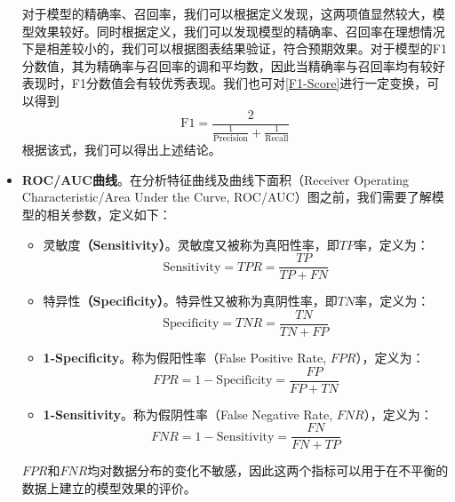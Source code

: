 \documentclass{MathorCupmodeling}
\begin{document}
\begin{itemize}
		对于模型的精确率、召回率，我们可以根据定义发现，这两项值显然较大，模型效果较好。同时根据定义，我们可以发现模型的精确率、召回率在理想情况下是相差较小的，我们可以根据图表结果验证，符合预期效果。对于模型的F1分数值，其为精确率与召回率的调和平均数，因此当精确率与召回率均有较好表现时，F1分数值会有较优秀表现。我们也可对\textcolor{blue}{\eqref{F1-Score}}进行一定变换，可以得到
		\begin{equation}
			\mathrm{F}1=\frac{2}{\frac{1}{\mathrm{Precision}}+\frac{1}{\mathrm{Recall}}} \label{ReacllNew}
		\end{equation}
		根据该式，我们可以得出上述结论。
		\item \textbf{ROC/AUC曲线}。在分析特征曲线及曲线下面积（Receiver Operating Characteristic/Area Under the Curve, ROC/AUC）图之前，我们需要了解模型的相关参数，定义如下：
		\begin{itemize}
			\item {\heiti 灵敏度}\textbf{（Sensitivity）}。灵敏度又被称为真阳性率，即$TP$率，定义为：
			\begin{equation}
				\mathrm{Sensitivity}=TPR=\frac{TP}{TP+FN} \label{Sensitivity}
			\end{equation}
			\item {\heiti 特异性}\textbf{（Specificity）}。特异性又被称为真阴性率，即$TN$率，定义为：
			\begin{equation}
				\mathrm{Specificity}=TNR=\frac{TN}{TN+FP} \label{Specificity}
			\end{equation}
			\item \textbf{1-Specificity}。称为假阳性率（False Positive Rate, $FPR$），定义为：
			\begin{equation}
				FPR=1-\mathrm{Specificity}=\frac{FP}{FP+TN} \label{FPR}
			\end{equation}
			\item \textbf{1-Sensitivity}。称为假阴性率（False Negative Rate, $FNR$），定义为：
			\begin{equation}
				FNR=1-\mathrm{Sensitivity}=\frac{FN}{FN+TP} \label{FNR}
			\end{equation}
		\end{itemize}
		$FPR$和$FNR$均对数据分布的变化不敏感\textcolor{blue}{\cite{procauc}}，因此这两个指标可以用于在不平衡的数据上建立的模型效果的评价。
		

\end{itemize}
\end{document}
